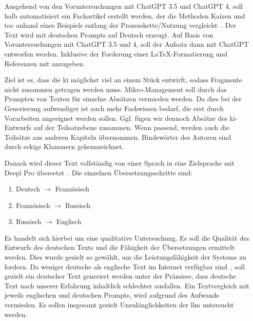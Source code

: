 
Ausgehend von den Voruntersuchungen mit ChatGPT 3.5 und ChatGPT 4, soll halb automatisiert ein Fachartikel erstellt werden,
der die Methoden Kaizen und \gls{toc} anhand eines Beispiels entlang der Prozesskette/Nutzung vergleicht~\cite{openai_chatgpt_nodate}. 
Der Text wird mit deutschen Prompts auf Deutsch erzeugt. Auf Basis von Voruntersuchungen mit ChatGPT 3.5 und 4, soll der Aufsatz dann mit ChatGPT entworfen werden. Inklusive der Forderung einer \LaTeX{}-Formatierung und Referenzen mit \BibTeX{} anzugeben.

Ziel ist es, dass die \gls{ki} möglichst viel an einem Stück entwirft, sodass Fragmente nicht zusammen getragen werden muss. Mikro-Management soll durch das Prompten von Texten für einzelne Absätzen vermieden werden. Da dies bei der Generierung aufwendiger ist auch mehr Fachwissen bedarf, die erst durch Vorarbeiten angeeignet werden sollen. Ggf. fügen wir dennoch Absätze des \gls{ki}-Entwurfs auf der Teilsatzebene zusammen. Wenn passend, werden auch die Teilsätze aus anderen Kapiteln übernommen. Bindewörter des Autoren sind durch eckige Klammern gekennzeichnet.

Danach wird dieser Text vollständig von einer Sprach in eine Zielsprache mit Deepl Pro übersetzt~\cite{deepl_deepl_nodate}.
Die einzelnen Übersetzungsschritte sind:

\begin{enumerate}
	\item Deutsch $\rightarrow$ Französisch
	\item Französisch $\rightarrow$ Russisch
	\item Russisch $\rightarrow$ Englisch
\end{enumerate}

Es handelt sich hierbei um eine qualitative Untersuchung. Es soll die Qualität des Entwurfs des deutschen Texts und die Fähigkeit der Übersetzungen ermittelt werden. Dies wurde gezielt so gewählt, um die Leistungsfähigkeit der Systeme zu fordern. Da weniger deutsche als englische Text im Internet verfügbar sind~\cite{noauthor_sprachen_nodate}, soll gezielt ein deutscher Text generiert werden unter der Prämisse, dass deutsche Text nach unserer Erfahrung inhaltlich schlechter ausfallen. Ein Textvergleich mit jeweils englischen und deutschen Prompts, wird aufgrund des Aufwands vermieden. Es sollen insgesamt gezielt Unzulänglichkeiten der \gls{llm} untersucht werden.

